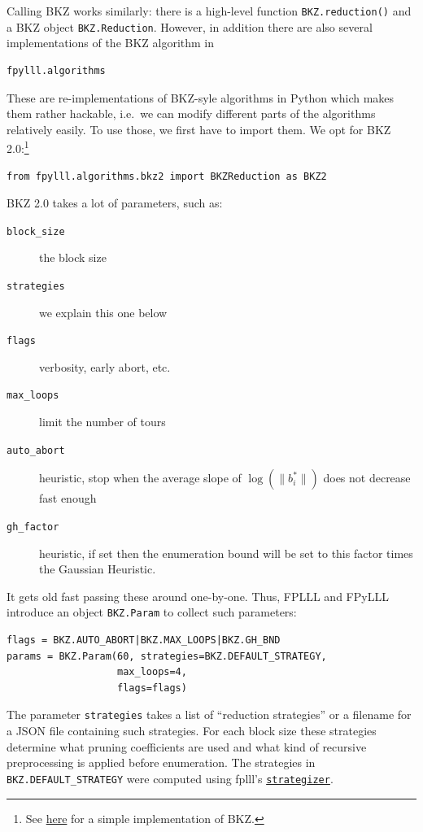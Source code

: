 \documentclass[10pt,a4paper,nobib]{tufte-handout}
\begin{document}
Calling BKZ works similarly: there is a high-level function \texttt{BKZ.reduction()} and a BKZ object \texttt{BKZ.Reduction}. However, in addition there are also several implementations of the BKZ algorithm in 
\begin{verbatim}
fpylll.algorithms
\end{verbatim}
These are re-implementations of BKZ-syle algorithms in Python which makes them rather hackable, i.e. we can modify different parts of the algorithms relatively easily. To use those, we first have to import them. We opt for BKZ 2.0:\footnote{See \href{https://github.com/fplll/fpylll/blob/master/src/fpylll/algorithms/simple\_bkz.py}{here} for a simple implementation of BKZ.}

\lstset{language=Python,label= ,caption= ,captionpos=b,numbers=none}
\begin{lstlisting}
from fpylll.algorithms.bkz2 import BKZReduction as BKZ2
\end{lstlisting}

BKZ 2.0 takes a lot of parameters, such as:
\begin{description}
\item[{\texttt{block\_size}}] the block size
\item[{\texttt{strategies}}] we explain this one below
\item[{\texttt{flags}}] verbosity, early abort, etc.
\item[{\texttt{max\_loops}}] limit the number of tours
\item[{\texttt{auto\_abort}}] heuristic, stop when the average slope of \(\log(\|b_i^*\|)\) does not decrease fast enough
\item[{\texttt{gh\_factor}}] heuristic, if set then the enumeration bound will be set to this factor times the Gaussian Heuristic.
\end{description}
It gets old fast passing these around one-by-one. Thus, FPLLL and FPyLLL introduce an object \texttt{BKZ.Param} to collect such parameters:

\lstset{language=Python,label= ,caption= ,captionpos=b,numbers=none}
\begin{lstlisting}
flags = BKZ.AUTO_ABORT|BKZ.MAX_LOOPS|BKZ.GH_BND 
params = BKZ.Param(60, strategies=BKZ.DEFAULT_STRATEGY,
                   max_loops=4,
                   flags=flags)
\end{lstlisting}

The parameter \texttt{strategies} takes a list of “reduction strategies” or a filename for a JSON file containing such strategies. For each block size these strategies determine what pruning coefficients are used and what kind of recursive preprocessing is applied before enumeration. The strategies in \texttt{BKZ.DEFAULT\_STRATEGY} were computed using fplll’s \href{https://github.com/fplll/strategizer}{\texttt{strategizer}}.
\end{document}
